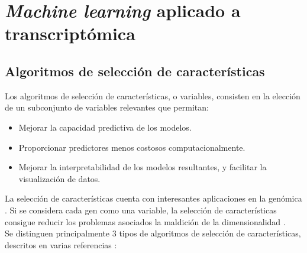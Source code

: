 \chapter{\textit{Machine learning} aplicado a transcriptómica}

\section{Algoritmos de selección de características}

Los algoritmos de selección de características, o variables, consisten en la elección de un subconjunto de variables relevantes que permitan:

\begin{itemize}
	\item Mejorar la capacidad predictiva de los modelos.
	\item Proporcionar predictores menos costosos computacionalmente.
	\item Mejorar la interpretabilidad de los modelos resultantes, y facilitar la visualización de datos.
 \end{itemize} 

La selección de características cuenta con interesantes aplicaciones en la genómica \cite{Xing, Tadist2019}. Si se considera cada gen como una variable, la selección de características consigue reducir los problemas asociados la maldición de la dimensionalidad \cite{Bellman1957, Bellman1961}. \\

Se distinguen principalmente 3 tipos de algoritmos de selección de características, descritos en varias referencias \cite{HerreraMaldonado2020, Tadist2019}:

